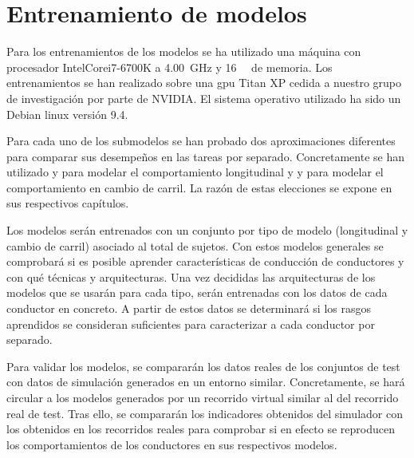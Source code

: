 \section{Entrenamiento de modelos}

Para los entrenamientos de los modelos se ha utilizado una máquina con procesador Intel\textregistered Core\texttrademark i7-6700K a \SI{4.00}{\giga\Hz} y \SI{16}{\gibi\byte} de memoria. Los entrenamientos se han realizado sobre una \gls{gpu} Titan XP cedida a nuestro grupo de investigación por parte de NVIDIA. El sistema operativo utilizado ha sido un Debian \gls{linux} versión 9.4. 

Para cada uno de los submodelos se han probado dos aproximaciones diferentes para comparar sus desempeños en las tareas por separado. Concretamente se han utilizado  y  para modelar el comportamiento longitudinal y  y  para modelar el comportamiento en cambio de carril. La razón de estas elecciones se expone en sus respectivos capítulos.

Los modelos serán entrenados con un conjunto por tipo de modelo (longitudinal y cambio de carril) asociado al total de sujetos. Con estos modelos generales se comprobará si es posible aprender características de conducción de conductores y con qué técnicas y arquitecturas. Una vez decididas las arquitecturas de los modelos que se usarán para cada tipo, serán entrenadas con los datos de cada conductor en concreto. A partir de estos datos se determinará si los rasgos aprendidos se consideran suficientes para caracterizar a cada conductor por separado.

Para validar los modelos, se compararán los datos reales de los conjuntos de test con datos de simulación generados en un entorno similar. Concretamente, se hará circular a los modelos generados por un recorrido virtual similar al del recorrido real de test. Tras ello, se compararán los indicadores obtenidos del simulador con los obtenidos en los recorridos reales para comprobar si en efecto se reproducen los comportamientos de los conductores en sus respectivos modelos.